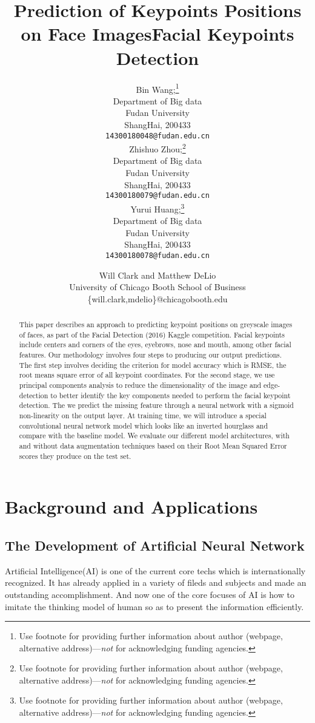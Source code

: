 \documentclass{article}
\title{Prediction of Keypoints Positions on Face Images}
\author{
Bin Wang;\thanks{ Use footnote for providing further information
about author (webpage, alternative address)---\emph{not} for acknowledging
funding agencies.} \\
Department of Big data\\
Fudan University\\
ShangHai, 200433\\
\texttt{14300180048@fudan.edu.cn} \\
\And
Zhishuo Zhou;\thanks{ Use footnote for providing further information
about author (webpage, alternative address)---\emph{not} for acknowledging
funding agencies.} \\
Department of Big data\\
Fudan University\\
ShangHai, 200433\\
\texttt{14300180079@fudan.edu.cn} \\
\AND
Yurui Huang;\thanks{ Use footnote for providing further information
about author (webpage, alternative address)---\emph{not} for acknowledging
funding agencies.} \\
Department of Big data\\
Fudan University\\
ShangHai, 200433\\
\texttt{14300180078@fudan.edu.cn} \\
}
\begin{document}
\maketitle

\begin{abstract}
This paper describes an approach to predicting keypoint positions on greyscale images of faces, as part of the Facial Detection (2016) Kaggle competition. Facial keypoints include centers and corners of the eyes, eyebrows, nose and mouth, among other facial features. Our methodology involves four steps to producing our output predictions. The first step involves deciding the criterion for model accuracy which is RMSE, the root means square error of all keypoint coordinates. For the second stage, we use principal components analysis to reduce the dimensionality of the image and edge-detection to better identify the key components needed to perform the facial keypoint detection. The we predict the missing feature through a neural network with a sigmoid non-linearity on the output layer. At training time, we will introduce a special convolutional neural network model which looks like an inverted hourglass and compare with the baseline model. We evaluate our different model architectures, with and without data augmentation techniques based on their Root Mean Squared Error scores they produce on the test set.
\end{abstract}

\title{Facial Keypoints Detection}
\author{Will Clark and Matthew DeLio\\
University of Chicago Booth School of Business\\
\textsf{\{will.clark,mdelio\}@chicagobooth.edu}}


\maketitle

\section{Background and Applications}\label{intro}
\subsection{The Development of Artificial Neural Network}
Artificial Intelligence(AI) is one of the current core techs which is internationally recognized. It has already applied in a variety of  fileds and subjects and made an outstanding accomplishment. And now one of the core focuses of AI is how to imitate the thinking model of human so as to  present the information efficiently.
\end{document}
